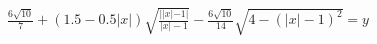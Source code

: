 \documentclass[preview]{standalone}
\begin{document}
\begin{align*}
\frac{6\sqrt{10}}{7} + (1.5 - 0.5|x|)\sqrt{\frac{||x|-1|}{|x|-1}} - \frac{6\sqrt{10}}{14} \sqrt{4 - (|x|-1)^2} = y
\end{align*}
\end{document}
